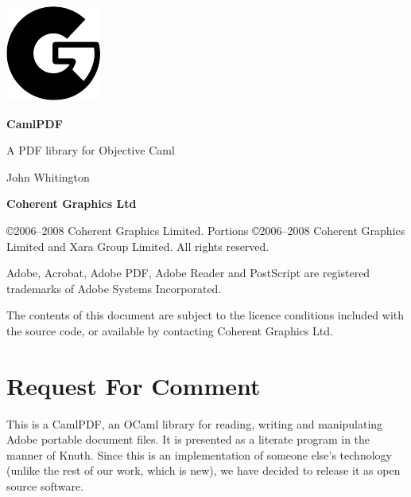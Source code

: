 \documentclass[a4paper,10pt]{memoir}
\begin{document}
\setlength{\cftsectionnumwidth}{10mm}
\setlength{\cftpartnumwidth}{8mm}


\frontmatter

\thispagestyle{empty}

\begin{flushright}
\includegraphics{logo.pdf}
\vspace{4mm}

{\sffamily \bfseries \Huge CamlPDF}
\vspace{6mm}

{\Huge A PDF library for Objective Caml}
\vspace{25mm}

{\LARGE John Whitington}
\vspace{2mm}

{\sffamily \bfseries \LARGE Coherent Graphics Ltd}

\end{flushright}

\clearpage

\thispagestyle{empty}

\vspace*{\fill}
\noindent\copyright 2006--2008 Coherent Graphics Limited. Portions \copyright 2006--2008 Coherent Graphics Limited and Xara Group Limited. All rights reserved.

\smallgap
\noindent Adobe, Acrobat, Adobe PDF, Adobe Reader and PostScript are registered trademarks
of Adobe Systems Incorporated.

\smallgap
\noindent The contents of this document are subject to the licence conditions included with the source code, or available by contacting Coherent Graphics Ltd.

\cleardoublepage

\chapter*{Request For Comment}

This is a CamlPDF, an OCaml library for reading, writing and manipulating Adobe
portable document files. It is presented as a literate program in the manner of
Knuth. Since this is an implementation of someone else's technology (unlike the
rest of our work, which is new), we have decided to release it as open source
software.
\end{document}
